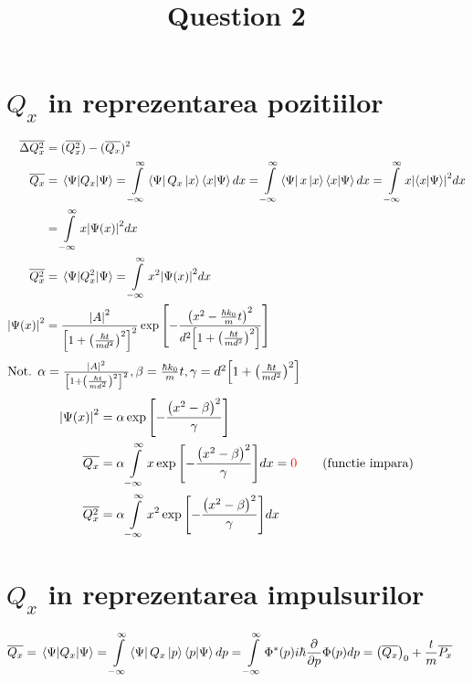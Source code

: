 \documentclass[11pt]{article} %
\title{Question 2}
\date{} %
\newcommand*{\mathcolor}{}
\def\mathcolor#1#{\mathcoloraux{#1}}
\newcommand*{\mathcoloraux}[3]{%
  \protect\leavevmode
  \begingroup
    \color#1{#2}#3%
  \endgroup
}
\newcommand*\mean[1]{\overline{#1}}
\newcommand{\integral}{\int\limits_{-\infty}^{\infty}}
\begin{document}
\maketitle

\section{\(Q_x\) in reprezentarea pozitiilor}
\label{sec:Qx-x}

\begin{align*}
  \mean{\Delta Q_x^2} &= (\mean{Q_x^2}) - (\mean{Q_x})^2 \\
  \mean{Q_x} &= \expval{Q_x}{\Psi} =
    \integral \bra{\Psi}Q_x\ket{x}\braket{x}{\Psi}dx =
    \integral \bra{\Psi}x\ket{x}\braket{x}{\Psi}dx =
    \integral x \abs{\braket{x}{\Psi}}^2 dx \\ &=
    \integral x \abs{\Psi(x)}^2 dx \\
  \mean{Q_x^2} &= \expval{Q_x^2}{\Psi} =
    \integral x^2 \abs{\Psi(x)}^2 dx \\
  \abs{\Psi(x)}^2 &= \frac{\abs{A}^2}{\qty[1+\qty(\frac{\hbar t}{m d^2})^2]^2}
    \exp\qty[- \frac{\qty(x^2 - \frac{\hbar k_0}{m} t)^2}{d^2 \qty[1+\qty(\frac{\hbar t}{m d^2})^2]}] \\
\end{align*}
\(
  \text{Not. } \alpha = \frac{\abs{A}^2}{\qty[1+\qty(\frac{\hbar t}{m d^2})^2]^2},
    \beta = \frac{\hbar k_0}{m} t, \gamma = d^2 \qty[1+\qty(\frac{\hbar t}{m d^2})^2]
\)
\begin{align*}
  \abs{\Psi(x)}^2 &= \alpha \exp\qty[- \frac{\qty(x^2-\beta)^2}{\gamma}] \\
  \mean{Q_x} &= \alpha \integral x \exp\qty[- \frac{\qty(x^2-\beta)^2}{\gamma}] dx = \mathcolor{red}{0} \tag{functie impara} \\
  \mean{Q_x^2} &= \alpha \integral x^2 \exp\qty[- \frac{\qty(x^2-\beta)^2}{\gamma}] dx
\end{align*}

\section{\(Q_x\) in reprezentarea impulsurilor}
\label{sec:Qx-p}

\begin{align*}
  \mean{Q_x} &= \expval{Q_x}{\Psi} =
    \integral \bra{\Psi}Q_x\ket{p}\braket{p}{\Psi}dp =
    \integral \Phi^*(p) i \hbar \pdv{p} \Phi(p) dp =
    \qty(\mean{Q_x})_0 + \frac{t}{m}\mean{P_x}
\end{align*}
\end{document}
